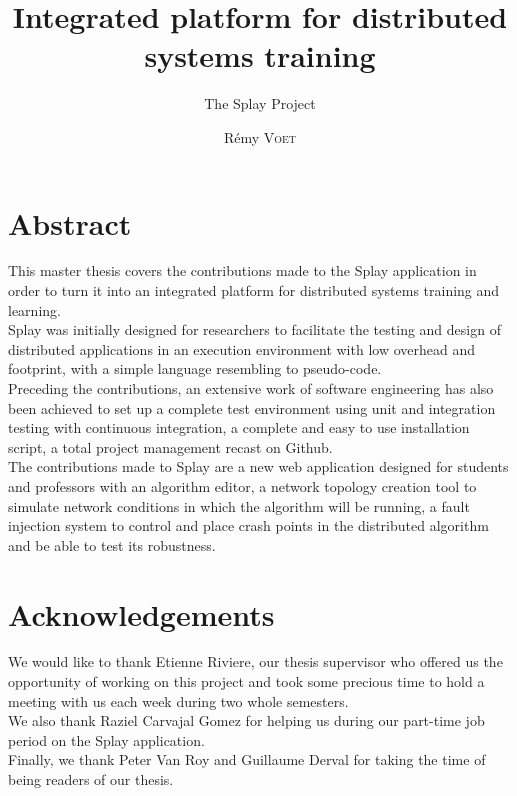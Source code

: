 \documentclass{eplmastersthesis}
\title{Integrated platform for distributed systems training}
\subtitle{The Splay Project}
\author{Rémy \textsc{Voet}}
\begin{document}
  \maketitle

  \chapter*{Abstract}

    This master thesis covers the contributions made to the Splay application
    in order to turn it into an integrated platform for distributed systems
    training and learning.\\
    Splay was initially designed for researchers to facilitate the testing and
    design of distributed applications in an execution environment with low
    overhead and footprint, with a simple language resembling to pseudo-code.\\

    Preceding the contributions, an extensive work of software engineering has
    also been achieved to set up a complete test environment using unit and
    integration testing with continuous integration, a complete and easy to use
    installation script, a total project management recast on Github.\\

    The contributions made to Splay are a new web application designed
    for students and professors with an algorithm editor, a network topology
    creation tool to simulate network conditions in which the algorithm will
    be running, a fault injection system to control and place crash points
    in the distributed algorithm and be able to test its robustness.

  \chapter*{Acknowledgements}

    We would like to thank Etienne Riviere, our thesis supervisor who offered
    us the opportunity of working on this project and took some precious time
    to hold a meeting with us each week during two whole semesters.\\

    We also thank Raziel Carvajal Gomez for helping us during our
    part-time job period on the Splay application.\\

    Finally, we thank Peter Van Roy and Guillaume Derval for taking the time
    of being readers of our thesis.
\end{document}
